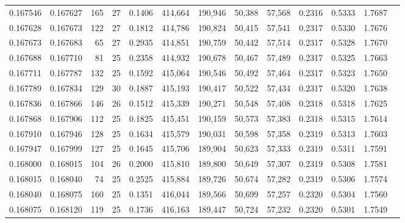 \begin{tabular}{rrrrrrrrrrrrr}
0.167546 & 0.167627 & 165 &  27 &                                     0.1406 & 414,664 & 190,946 &  50,388 &  57,568 & 0.2316 & 0.5333 & 1.7687 \\
0.167628 & 0.167673 & 122 &  27 &                                     0.1812 & 414,786 & 190,824 &  50,415 &  57,541 & 0.2317 & 0.5330 & 1.7676 \\
0.167673 & 0.167683 &  65 &  27 &                                     0.2935 & 414,851 & 190,759 &  50,442 &  57,514 & 0.2317 & 0.5328 & 1.7670 \\
0.167688 & 0.167710 &  81 &  25 &                                     0.2358 & 414,932 & 190,678 &  50,467 &  57,489 & 0.2317 & 0.5325 & 1.7663 \\
0.167711 & 0.167787 & 132 &  25 &                                     0.1592 & 415,064 & 190,546 &  50,492 &  57,464 & 0.2317 & 0.5323 & 1.7650 \\
0.167789 & 0.167834 & 129 &  30 &                                     0.1887 & 415,193 & 190,417 &  50,522 &  57,434 & 0.2317 & 0.5320 & 1.7638 \\
0.167836 & 0.167866 & 146 &  26 &                                     0.1512 & 415,339 & 190,271 &  50,548 &  57,408 & 0.2318 & 0.5318 & 1.7625 \\
0.167868 & 0.167906 & 112 &  25 &                                     0.1825 & 415,451 & 190,159 &  50,573 &  57,383 & 0.2318 & 0.5315 & 1.7614 \\
0.167910 & 0.167946 & 128 &  25 &                                     0.1634 & 415,579 & 190,031 &  50,598 &  57,358 & 0.2319 & 0.5313 & 1.7603 \\
0.167947 & 0.167999 & 127 &  25 &                                     0.1645 & 415,706 & 189,904 &  50,623 &  57,333 & 0.2319 & 0.5311 & 1.7591 \\
0.168000 & 0.168015 & 104 &  26 &                                     0.2000 & 415,810 & 189,800 &  50,649 &  57,307 & 0.2319 & 0.5308 & 1.7581 \\
0.168015 & 0.168040 &  74 &  25 &                                     0.2525 & 415,884 & 189,726 &  50,674 &  57,282 & 0.2319 & 0.5306 & 1.7574 \\
0.168040 & 0.168075 & 160 &  25 &                                     0.1351 & 416,044 & 189,566 &  50,699 &  57,257 & 0.2320 & 0.5304 & 1.7560 \\
0.168075 & 0.168120 & 119 &  25 &                                     0.1736 & 416,163 & 189,447 &  50,724 &  57,232 & 0.2320 & 0.5301 & 1.7549 \\

\end{tabular}
